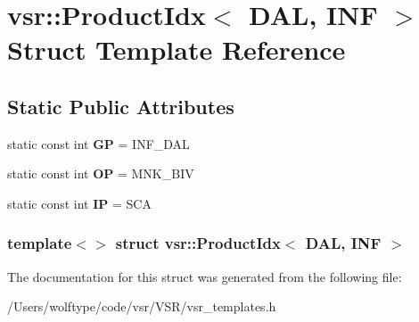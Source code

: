 \hypertarget{structvsr_1_1_product_idx_3_01_d_a_l_00_01_i_n_f_01_4}{\section{vsr\-:\-:Product\-Idx$<$ D\-A\-L, I\-N\-F $>$ Struct Template Reference}
\label{structvsr_1_1_product_idx_3_01_d_a_l_00_01_i_n_f_01_4}
}
\subsection*{Static Public Attributes}
\begin{DoxyCompactItemize}
\item 
\hypertarget{structvsr_1_1_product_idx_3_01_d_a_l_00_01_i_n_f_01_4_ae19525244c82f7cf1b94f4b3e91c42b6}{static const int {\bfseries G\-P} = I\-N\-F\-\_\-\-D\-A\-L}\label{structvsr_1_1_product_idx_3_01_d_a_l_00_01_i_n_f_01_4_ae19525244c82f7cf1b94f4b3e91c42b6}

\item 
\hypertarget{structvsr_1_1_product_idx_3_01_d_a_l_00_01_i_n_f_01_4_abe378dc079e24a85adc675c76013955f}{static const int {\bfseries O\-P} = M\-N\-K\-\_\-\-B\-I\-V}\label{structvsr_1_1_product_idx_3_01_d_a_l_00_01_i_n_f_01_4_abe378dc079e24a85adc675c76013955f}

\item 
\hypertarget{structvsr_1_1_product_idx_3_01_d_a_l_00_01_i_n_f_01_4_a4fcb00fdc397c3cee6918837fbc3b088}{static const int {\bfseries I\-P} = S\-C\-A}\label{structvsr_1_1_product_idx_3_01_d_a_l_00_01_i_n_f_01_4_a4fcb00fdc397c3cee6918837fbc3b088}

\end{DoxyCompactItemize}
\subsubsection*{template$<$$>$ struct vsr\-::\-Product\-Idx$<$ D\-A\-L, I\-N\-F $>$}



The documentation for this struct was generated from the following file\-:\begin{DoxyCompactItemize}
\item 
/\-Users/wolftype/code/vsr/\-V\-S\-R/vsr\-\_\-templates.\-h\end{DoxyCompactItemize}
